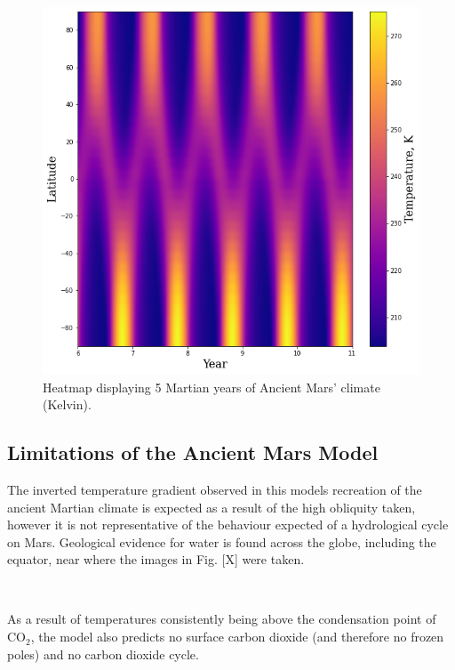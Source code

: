 \documentclass[12pt,onecolumn]{revtex4-2}    %
\begin{document}
\begin{figure}[H]
\centering
\includegraphics[width = 14cm]{ancient_mars_heatmap.png}
\caption{Heatmap displaying 5 Martian years of Ancient Mars' climate (Kelvin).}
\label{fig:test}
\end{figure}

\subsection{Limitations of the Ancient Mars Model}

The inverted temperature gradient observed in this models recreation of the ancient Martian climate is expected as a result of the high obliquity taken, however it is not representative of the behaviour expected of a hydrological cycle on Mars. Geological evidence for water is found across the globe, including the equator, near where the images in Fig. [X] were taken. 

\

As a result of temperatures consistently being above the condensation point of $\mathrm{CO_2}$, the model also predicts no surface carbon dioxide (and therefore no frozen poles) and no carbon dioxide cycle. 

\
\end{document}
